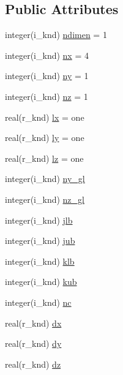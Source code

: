 \subsection*{Public Attributes}
\begin{DoxyCompactItemize}
\item 
integer(i\-\_\-knd) \hyperlink{classgeom__module_a764bf4ab4dc187512c803d73505e6b57}{ndimen} = 1
\item 
integer(i\-\_\-knd) \hyperlink{classgeom__module_a7a5902416f1d33e2a27620d6c82db061}{nx} = 4
\item 
integer(i\-\_\-knd) \hyperlink{classgeom__module_a38b87580d41ec11b8719f65f06b8b0a3}{ny} = 1
\item 
integer(i\-\_\-knd) \hyperlink{classgeom__module_a5f461a2f10c78de302a44c8c70b8fca5}{nz} = 1
\item 
real(r\-\_\-knd) \hyperlink{classgeom__module_a1fe9e4dc8297fc98198b561000a97973}{lx} = one
\item 
real(r\-\_\-knd) \hyperlink{classgeom__module_adc5d5005b562bb94578c33b5bcde0012}{ly} = one
\item 
real(r\-\_\-knd) \hyperlink{classgeom__module_aba080d6dd2b57ad40676a7331daaa824}{lz} = one
\item 
integer(i\-\_\-knd) \hyperlink{classgeom__module_a28abec0d4fe709bc64ee36b68347ce1a}{ny\-\_\-gl}
\item 
integer(i\-\_\-knd) \hyperlink{classgeom__module_a3d237cf21a21064504566ce34b27c848}{nz\-\_\-gl}
\item 
integer(i\-\_\-knd) \hyperlink{classgeom__module_a87c8f8859d2d98c1dfc36f0ccf4208df}{jlb}
\item 
integer(i\-\_\-knd) \hyperlink{classgeom__module_ada7a9e753e21b30a06f0858f5deb4300}{jub}
\item 
integer(i\-\_\-knd) \hyperlink{classgeom__module_a7c3abb8b57ed30570288a1da71db8444}{klb}
\item 
integer(i\-\_\-knd) \hyperlink{classgeom__module_a79842b1abc678e999d926bc361620371}{kub}
\item 
integer(i\-\_\-knd) \hyperlink{classgeom__module_af92dc09eacd9c240bd51ea2792a13820}{nc}
\item 
real(r\-\_\-knd) \hyperlink{classgeom__module_a2f292c19b0e9bfc4cde1d54f0e9d4472}{dx}
\item 
real(r\-\_\-knd) \hyperlink{classgeom__module_a13234163c83c1041d8053ab0f4ea5d40}{dy}
\item 
real(r\-\_\-knd) \hyperlink{classgeom__module_a59842db695f66127f749bffd9df2f034}{dz}
\item 

\end{DoxyCompactItemize}
